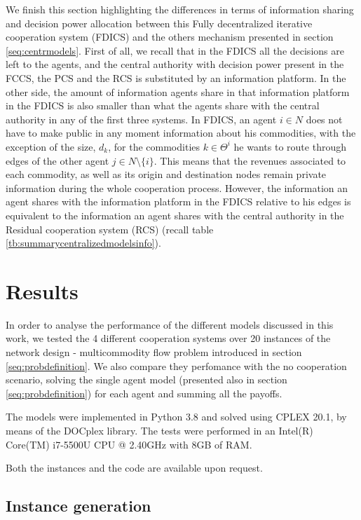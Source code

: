 \documentclass{article}
\begin{document}
We finish this section highlighting the differences in terms of information sharing and decision power allocation between this Fully decentralized iterative cooperation system (FDICS) and the others mechanism presented in section \ref{seq:centrmodels}. First of all, we recall that in the FDICS all the decisions are left to the agents, and the central authority with decision power present in the FCCS, the PCS and the RCS is substituted by an information platform. In the other side, the amount of information agents share in that information platform in the FDICS is also smaller than what the agents share with the central authority in any of the first three systems. In FDICS, an agent $i\in N$ does not have to make public in any moment information about his commodities, with the exception of the size, $d_k$, for the commodities $k\in \Theta^i$ he wants to route through edges of the other agent $j\in N\setminus\{i\}$. This means that the revenues associated to each commodity, as well as its origin and destination nodes remain private information during the whole cooperation process. However, the information an agent shares with the information platform in the FDICS relative to his edges is equivalent to the information an agent shares with the central authority in the Residual cooperation system (RCS) (recall table \ref{tb:summarycentralizedmodelsinfo}).

\section{Results} \label{seq:results}

In order to analyse the performance of the different models discussed in this work, we tested the 4 different cooperation systems over 20 instances of the network design - multicommodity flow problem introduced in section \ref{seq:probdefinition}. We also compare they perfomance with the no cooperation scenario, solving the single agent model (presented also in section \ref{seq:probdefinition}) for each agent and summing all the payoffs.

The models were implemented in Python 3.8 and solved using CPLEX 20.1, by means of the DOCplex library. The tests were performed in an  Intel(R) Core(TM) i7-5500U CPU @ 2.40GHz with 8GB of RAM.

Both the instances and the code are available upon request.


\subsection{Instance generation}
\end{document}
